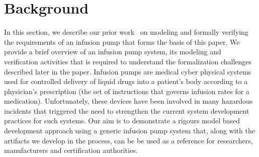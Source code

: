 \section{Background}
\label{sec:gpca-overview}

In this section, we describe our prior work~\cite{hilt2013, req2code} on modeling and formally verifying the requirements of an infusion pump that forms the basis of this paper. We provide a brief overview of an infusion pump system, its modeling and verification activities that is required to understand the formalization challenges described later in the paper. Infusion pumps are medical cyber physical systems used for controlled delivery of liquid drugs into a patient's body according to a physician's prescription (the set of instructions that governs infusion rates for a medication). Unfortunately, these devices have been involved in many hazardous incidents that triggered the need to strengthen the current system development practices for such systems. Our aim is to demonstrate a rigours model based development approach using a generic infusion pump system that, along with the artifacts we develop in the process, can be be used as a reference for researchers, manufacturers and certification authorities.

